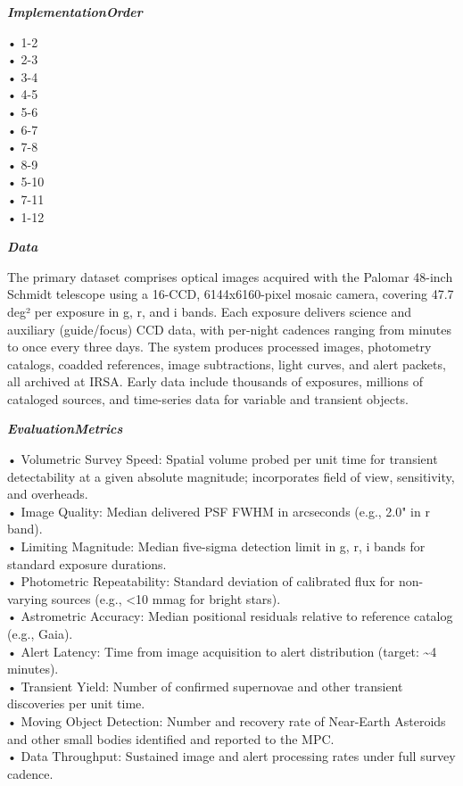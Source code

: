 \begin{tcolorbox}[
    breakable,
    title={Example of Idea Generation in Astronomy},
    colback=LighterGray,
    colframe=DeepPurple,
    colbacktitle=DeepPurple,
    coltitle=White,
]
\textbf{\emph{\textcolor{CaseOrange}{ImplementationOrder}}}

• 1-2 \\
• 2-3 \\
• 3-4 \\
• 4-5 \\
• 5-6 \\
• 6-7 \\
• 7-8 \\
• 8-9 \\
• 5-10 \\
• 7-11 \\
• 1-12 

\textbf{\emph{\textcolor{CaseOrange}{Data}}}

The primary dataset comprises optical images acquired with the Palomar 48-inch Schmidt telescope
using a 16-CCD, 6144x6160-pixel mosaic camera, covering 47.7 deg² per exposure in g, r, and i bands.
Each exposure delivers science and auxiliary (guide/focus) CCD data, with per-night cadences ranging
from minutes to once every three days. The system produces processed images, photometry catalogs,
coadded references, image subtractions, light curves, and alert packets, all archived at IRSA. Early
data include thousands of exposures, millions of cataloged sources, and time-series data for
variable and transient objects.

\textbf{\emph{\textcolor{CaseOrange}{EvaluationMetrics}}}

• Volumetric Survey Speed: Spatial volume probed per unit time for transient detectability at a given absolute magnitude; incorporates field of view, sensitivity, and overheads. \\
• Image Quality: Median delivered PSF FWHM in arcseconds (e.g., 2.0" in r band). \\
• Limiting Magnitude: Median five-sigma detection limit in g, r, i bands for standard exposure durations. \\
• Photometric Repeatability: Standard deviation of calibrated flux for non-varying sources (e.g., <10 mmag for bright stars). \\
• Astrometric Accuracy: Median positional residuals relative to reference catalog (e.g., Gaia). \\
• Alert Latency: Time from image acquisition to alert distribution (target: \~{}4 minutes). \\
• Transient Yield: Number of confirmed supernovae and other transient discoveries per unit time. \\
• Moving Object Detection: Number and recovery rate of Near-Earth Asteroids and other small bodies identified and reported to the MPC. \\
• Data Throughput: Sustained image and alert processing rates under full survey cadence. 


\end{tcolorbox}
